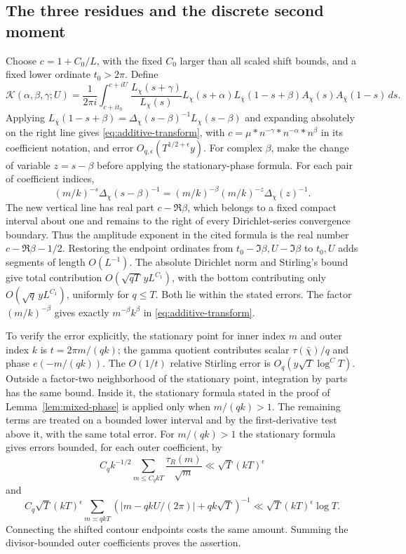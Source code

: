\subsection{The three residues and the discrete second moment}
Choose $c=1+C_0/L$, with the fixed $C_0$ larger than all scaled
shift bounds, and a fixed lower ordinate $t_0>2\pi$. Define
\[
 \mathcal K(\alpha,\beta,\gamma;U)
 =\frac1{2\pi i}\int_{c+it_0}^{c+iU}
 \frac{L_\chi(s+\gamma)}{L_\chi(s)}L_\chi(s+\alpha)
 L_{\bar\chi}(1-s+\beta)A_\chi(s)A_{\bar\chi}(1-s)\,ds.
\]
Applying $L_{\bar\chi}(1-s+\beta)=
\Delta_\chi(s-\beta)^{-1}L_\chi(s-\beta)$ and expanding absolutely
on the right line gives \eqref{eq:additive-transform}, with
$c=\mu*n^{-\gamma}*n^{-\alpha}*n^\beta$ in its coefficient notation,
and error $O_{q,\epsilon}(T^{1/2+\epsilon}y)$.
For complex $\beta$, make the change of variable $z=s-\beta$ before
applying the stationary-phase formula. For each pair of coefficient
indices,
\[
 (m/k)^{-s}\Delta_\chi(s-\beta)^{-1}
   =(m/k)^{-\beta}(m/k)^{-z}\Delta_\chi(z)^{-1}.
\]
The new vertical line has real part $c-\Re\beta$, which belongs
to a fixed compact interval about one and remains to the right of
every Dirichlet-series convergence boundary. Thus the amplitude
exponent in the cited formula is the real number
$c-\Re\beta-1/2$. Restoring the endpoint ordinates from
$t_0-\Im\beta,U-\Im\beta$ to $t_0,U$ adds segments of length
$O(L^{-1})$. The absolute Dirichlet norm and Stirling's bound give
total contribution $O(\sqrt{qT}\,yL^{C_1})$, with the bottom
contributing only $O(\sqrt q\,yL^{C_1})$, uniformly for $q\le T$.
Both lie within the stated errors. The factor $(m/k)^{-\beta}$
gives exactly $m^{-\beta}k^\beta$ in
\eqref{eq:additive-transform}.

To verify the error explicitly, the stationary point for inner index
$m$ and outer index $k$ is $t=2\pi m/(qk)$; the gamma quotient
contributes scalar $\tau(\bar\chi)/q$ and phase $e(-m/(qk))$.
The $O(1/t)$ relative Stirling error is $O_q(y\sqrt T\log^C T)$.
Outside a factor-two neighborhood of the stationary point, integration
by parts has the same bound. Inside it, the stationary formula stated
in the proof of Lemma~\ref{lem:mixed-phase} is applied only when
$m/(qk)>1$. The remaining terms are treated on a bounded lower
interval and by the first-derivative test above it, with the same
total error. For $m/(qk)>1$ the stationary formula gives errors bounded,
for each outer coefficient, by
\[
 C_q k^{-1/2}\sum_{m\le C_qkT}\frac{\tau_R(m)}{\sqrt m}
 \ll\sqrt T(kT)^\epsilon
\]
and
\[
 C_q\sqrt T(kT)^\epsilon\sum_{m\asymp qkT}
       (|m-qkU/(2\pi)|+qk\sqrt T)^{-1}
 \ll\sqrt T(kT)^\epsilon\log T.
\]
Connecting the shifted contour endpoints costs the same amount.
Summing the divisor-bounded outer coefficients proves the assertion.


